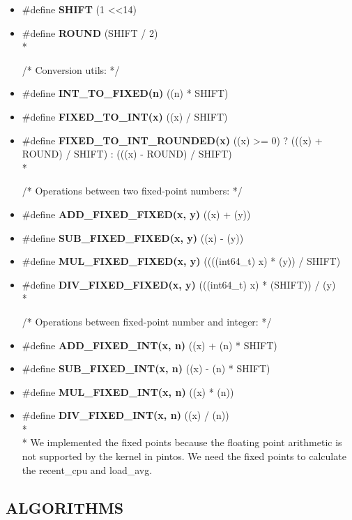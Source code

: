 \documentclass{article}
\begin{document}
\begin{itemize}
\item \#define \textbf{SHIFT} (1 \textless \textless 14)
\item \#define \textbf{ROUND} (SHIFT / 2)\\*

/* Conversion utils: */
\item \#define \textbf{INT\_TO\_FIXED(n)} ((n) * SHIFT)
\item \#define \textbf{FIXED\_TO\_INT(x)} ((x) / SHIFT)
\item \#define \textbf{FIXED\_TO\_INT\_ROUNDED(x)}
((x) \textgreater = 0) ? (((x) + ROUND) / SHIFT) : (((x) - ROUND) / SHIFT)\\*

/* Operations between two fixed-point numbers: */
\item \#define \textbf{ADD\_FIXED\_FIXED(x, y)} ((x) + (y))
\item \#define \textbf{SUB\_FIXED\_FIXED(x, y)} ((x) - (y))
\item \#define \textbf{MUL\_FIXED\_FIXED(x, y)} ((((int64\_t) x) * (y)) / SHIFT)
\item \#define \textbf{DIV\_FIXED\_FIXED(x, y)} (((int64\_t) x) * (SHIFT)) / (y)\\*

/* Operations between fixed-point number and integer: */
\item \#define \textbf{ADD\_FIXED\_INT(x, n)} ((x) + (n) * SHIFT)
\item \#define \textbf{SUB\_FIXED\_INT(x, n)} ((x) - (n) * SHIFT)
\item \#define \textbf{MUL\_FIXED\_INT(x, n)} ((x) * (n))
\item \#define \textbf{DIV\_FIXED\_INT(x, n)} ((x) / (n))\\*\\*
We implemented the fixed points because the floating point arithmetic is not supported by the kernel in pintos. We need the fixed points to calculate the recent\_cpu and load\_avg.
\end{itemize}

\subsection*{ALGORITHMS}
\justify
\end{document}
